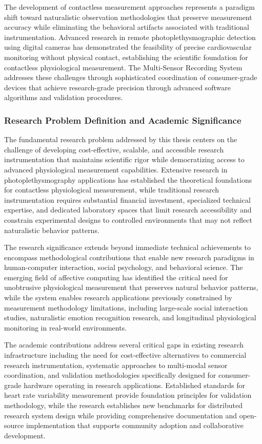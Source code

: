 \documentclass[11pt,a4paper]{article}
\begin{document}
The development of contactless measurement approaches represents a paradigm shift toward naturalistic observation
methodologies that preserve measurement accuracy while eliminating the behavioral artifacts associated with traditional
instrumentation. Advanced research in remote photoplethysmographic detection using digital cameras has demonstrated the
feasibility of precise cardiovascular monitoring without physical contact, establishing the scientific foundation for
contactless physiological measurement. The Multi-Sensor Recording System addresses these challenges through
sophisticated coordination of consumer-grade devices that achieve research-grade precision through advanced software
algorithms and validation procedures.

\subsubsection{Research Problem Definition and Academic Significance}

The fundamental research problem addressed by this thesis centers on the challenge of developing cost-effective,
scalable, and accessible research instrumentation that maintains scientific rigor while democratizing access to advanced
physiological measurement capabilities. Extensive research in photoplethysmography applications has established the
theoretical foundations for contactless physiological measurement, while traditional research instrumentation requires
substantial financial investment, specialized technical expertise, and dedicated laboratory spaces that limit research
accessibility and constrain experimental designs to controlled environments that may not reflect naturalistic behavior
patterns.

The research significance extends beyond immediate technical achievements to encompass methodological contributions that
enable new research paradigms in human-computer interaction, social psychology, and behavioral science. The emerging
field of affective computing has identified the critical need for unobtrusive physiological measurement that preserves
natural behavior patterns, while the system enables research applications previously constrained by measurement
methodology limitations, including large-scale social interaction studies, naturalistic emotion recognition research,
and longitudinal physiological monitoring in real-world environments.

The academic contributions address several critical gaps in existing research infrastructure including the need for
cost-effective alternatives to commercial research instrumentation, systematic approaches to multi-modal sensor
coordination, and validation methodologies specifically designed for consumer-grade hardware operating in research
applications. Established standards for heart rate variability measurement provide foundation principles for validation
methodology, while the research establishes new benchmarks for distributed research system design while providing
comprehensive documentation and open-source implementation that supports community adoption and collaborative
development.
\end{document}
